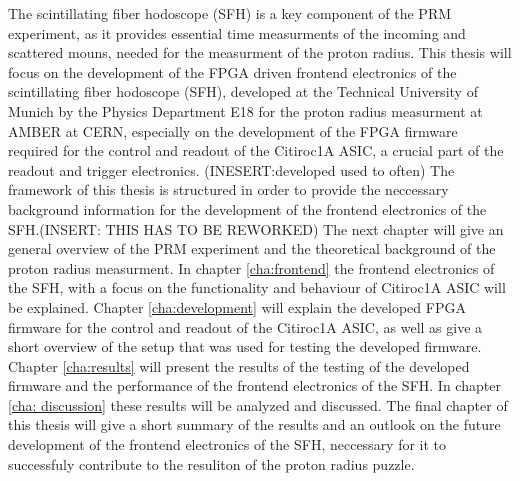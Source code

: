 \newline
The scintillating fiber hodoscope (SFH) is a key component of the PRM experiment, as it provides essential time measurments of the incoming and scattered mouns, needed for the measurment of the proton radius.\Autocite{ProposalAmber}
\newline
This thesis will focus on the development of the FPGA driven frontend electronics of the scintillating fiber hodoscope (SFH),
developed at the Technical University of Munich by the Physics Department E18 for the proton radius measurment at AMBER at CERN,
especially on the development of the FPGA firmware required for the control and readout of the Citiroc1A ASIC,
a crucial part of the readout and trigger electronics.
(INESERT:developed used to often)
\newline 
The framework of this thesis is structured in order to provide the neccessary background information for the development of the frontend electronics of the SFH.(INSERT: THIS HAS TO BE REWORKED)
\newline
The next chapter will give an general overview of the PRM experiment and the theoretical background of the proton radius measurment.
\newline 
In chapter \ref{cha:frontend} the frontend electronics of the SFH, with a focus on the functionality and behaviour of Citiroc1A ASIC will be explained.
\newline
Chapter \ref{cha:development} will explain the developed FPGA firmware for the control and readout of the Citiroc1A ASIC, as well as give a short overview of the setup that was used for testing the developed firmware.
\newline
Chapter \ref{cha:results} will present the results of the testing of the developed firmware and the performance of the frontend electronics of the SFH.
\newline
In chapter \ref{cha: discussion} these results will be analyzed and discussed.
\newline 
The final chapter of this thesis will give a short summary of the results and an outlook on the future development of the frontend electronics of the SFH,
neccessary for it to successfuly contribute to the resuliton of the proton radius puzzle.



 
